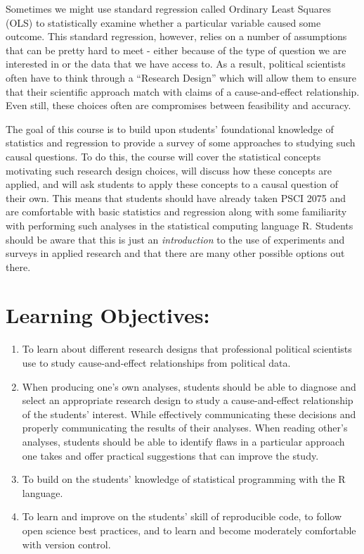 \documentclass[11pt, a4paper]{article}
\begin{document}
Sometimes we might use standard regression called Ordinary Least Squares (OLS) to statistically examine whether a particular variable caused some outcome. This standard regression, however, relies on a number of assumptions that can be pretty hard to meet - either because of the type of question we are interested in or the data that we have access to. As a result, political scientists often have to think through a ``Research Design'' which will allow them to ensure that their scientific approach match with claims of a cause-and-effect relationship. Even still, these choices often are compromises between feasibility and accuracy.

The goal of this course is to build upon students' foundational knowledge of statistics and regression to provide a survey of some approaches to studying such causal questions. To do this, the course will cover the statistical concepts motivating such research design choices, will discuss how these concepts are applied, and will ask students to apply these concepts to a causal question of their own. This means that students should have already taken PSCI 2075 and are comfortable with basic statistics and regression along with some familiarity with performing such analyses in the statistical computing language R. Students should be aware that this is just an \textit{introduction} to the use of experiments and surveys in applied research and that there are many other possible options out there.


\section*{Learning Objectives:} 
    \begin{enumerate}
        \item To learn about different research designs that professional political scientists use to study cause-and-effect relationships from political data.
        \item When producing one's own analyses, students should be able to diagnose and select an appropriate research design to study a cause-and-effect relationship of the students' interest. While effectively communicating these decisions and properly communicating the results of their analyses. When reading other's analyses, students should be able to identify flaws in a particular approach one takes and offer practical suggestions that can improve the study.
        \item To build on the students' knowledge of statistical programming with the R language.
        \item To learn and improve on the students' skill of reproducible code, to follow open science best practices, and to learn and become moderately comfortable with version control.
    \end{enumerate}
\end{document}
